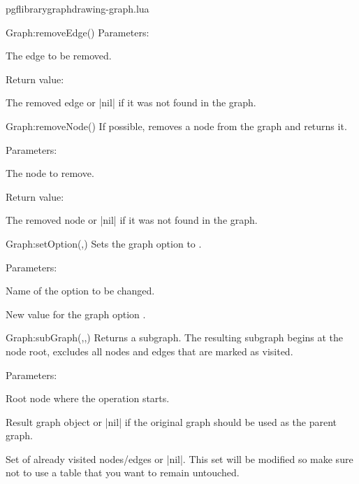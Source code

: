 \begin{filedescription}{pgflibrarygraphdrawing-graph.lua}
\begin{luacommand}{{Graph:removeEdge}()}
Parameters:
\begin{parameterdescription}
	\item[\meta{edge}] The edge to be removed. 
\end{parameterdescription}


Return value:
\begin{parameterdescription} 
  \item[] The removed edge or |nil| if it was not found in the graph. 
\end{parameterdescription}


\end{luacommand}
\begin{luacommand}{{Graph:removeNode}()}
If possible, removes a node from the graph and returns it. 

Parameters:
\begin{parameterdescription}
	\item[\meta{node}] The node to remove. 
\end{parameterdescription}


Return value:
\begin{parameterdescription} 
  \item[] The removed node or |nil| if it was not found in the graph. 
\end{parameterdescription}


\end{luacommand}
\begin{luacommand}{{Graph:setOption}(,)}
Sets the graph option  to . 

Parameters:
\begin{parameterdescription}
	\item[\meta{name}] Name of the option to be changed.\item[\meta{value}] New value for the graph option . 
\end{parameterdescription}



\end{luacommand}
\begin{luacommand}{{Graph:subGraph}(,,)}
Returns a subgraph.  The resulting subgraph begins at the node root, excludes all nodes and edges that are marked as visited. 

Parameters:
\begin{parameterdescription}
	\item[\meta{root}] Root node where the operation starts.\item[\meta{graph}] Result graph object or |nil| if the original graph should be used as the parent graph.\item[\meta{visited}] Set of already visited nodes/edges or |nil|. This set will be modified so make sure not to use a table that you want to remain untouched. 
\end{parameterdescription}




\end{luacommand}
\end{filedescription}
